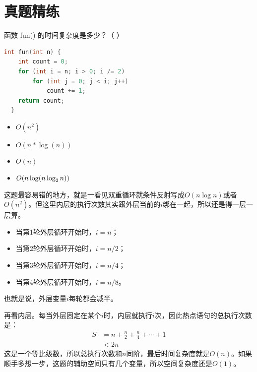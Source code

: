 \documentclass[b5paper,11pt]{article}
\begin{document}
\section{真题精练}
\begin{question}
  函数 fun() 的时间复杂度是多少？（ ）
\begin{lstlisting}[language=C]
  int fun(int n) {
    int count = 0;
    for (int i = n; i > 0; i /= 2)
        for (int j = 0; j < i; j++)
            count += 1;
    return count;
  }
\end{lstlisting}

  \begin{itemize}
    \item[A] $O(n^2)$
    \item[B] $O(n * \log(n))$
    \item[C] $O(n)$
    \item[D] $O(n \relax \log(n \relax \log_2n))$
  \end{itemize}
\end{question}

\begin{solution}
  这题最容易错的地方，就是一看见双重循环就条件反射写成$O(n\log n)$或者$O(n^2)$。但这里内层的执行次数其实跟外层当前的$i$绑在一起，所以还是得一层一层算。
  \begin{itemize}
    \item 当第1轮外层循环开始时，$i = n$；
    \item 当第2轮外层循环开始时，$i = n / 2$；
    \item 当第3轮外层循环开始时，$i = n / 4$；
    \item 当第4轮外层循环开始时，$i = n / 8$。
  \end{itemize}
  也就是说，外层变量$i$每轮都会减半。

  再看内层。每当外层固定在某个$i$时，内层就执行$i$次，因此热点语句的总执行次数是：
  \begin{equation*}
    \begin{aligned}
      S &= n + \frac{n}{2} + \frac{n}{4} + \cdots + 1 \\
      &< 2n
    \end{aligned}
  \end{equation*}
  这是一个等比级数，所以总执行次数和$n$同阶，最后时间复杂度就是$O(n)$。如果顺手多想一步，这题的辅助空间只有几个变量，所以空间复杂度还是$O(1)$。
\end{solution}

\vspace{1.0em}
\end{document}
